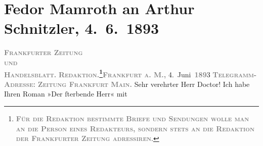 

         
         \newcommand{\erwaehntePersonen}{Personen: }
         \newcommand{\erwaehnteInstitutionen}{Institutionen: Frankfurter Zeitung}
         \newcommand{\erwaehnteOrte}{Orte: Frankfurt am Main, Wien}
         \newcommand{\erwaehnteWerke}{Werke: Sterben. Novelle}
               \section[Fedor Mamroth an Arthur Schnitzler, 4. 6. 1893]{ Fedor Mamroth an Arthur Schnitzler, 4. 6. 1893}\nopagebreak{}\rehead{ }\begin{ledgroupsized}[t]{13cm}\normalsize\beginnumbering \toendnotes[C]{\smallbreak\pagebreak[2]} 
\toendnotes[C]{\smallbreak}\pstart
           \noindent{}{\pb}\textcolor{gray}{\textbf{\textsc{Frankfurter Zeitung}}}{\\}\textsc{\textcolor{gray}{\textbf{und}}}{\\}\textcolor{gray}{\textbf{\textsc{Handelsblatt.}}}\pend
           \pstart
           \textcolor{gray}{\textbf{\textsc{Redaktion.\footnote{\noindent{}\textcolor{gray}{\textbf{\textsc{Für die Redaktion bestimmte
                                                  Briefe und Sendungen wolle man  an die Person eines
                                                  Redakteurs, sondern stets \textbf{an die
                                                  Redaktion der Frankfurter Zeitung}
                                                  adressiren}}}.}}}}\hfill \textcolor{gray}{\textbf{\textsc{Frankfurt a. M.,}}}{ }4. Juni \textsc{\textcolor{gray}{\textbf{189}}}3\pend
           \pstart
           \textcolor{gray}{\textbf{\textsc{Telegramm-Adresse:}}}\pend
           \pstart
           \textcolor{gray}{\textbf{\textsc{Zeitung Frankfurt Main.}}}\pend
           \pstart{}Sehr verehrter Herr Doctor!\pend\pstart
           Ich habe Ihren Roman »Der ſterbende Herr« mit

\end{ledgroupsized}
